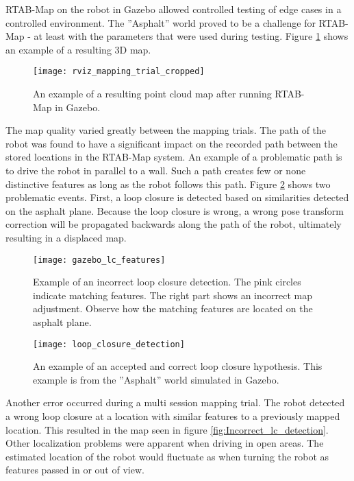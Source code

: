 \ac{RTAB-Map} on the robot in Gazebo allowed controlled testing of edge cases in a controlled environment. The ''Asphalt'' world proved to be a challenge for \ac{RTAB-Map} - at least with the parameters that were used during testing. Figure \ref{fig:rviz_mapping_trial} shows an example of a resulting 3D map. 

\begin{figure}[h]
	\centering
	\texttt{[image: rviz\_mapping\_trial\_cropped]}
	\caption{An example of a resulting point cloud map after running \ac{RTAB-Map} in Gazebo. }
	\label{fig:rviz_mapping_trial}
\end{figure}

The map quality varied greatly between the mapping trials. The path of the robot was found to have a significant impact on the recorded path between the stored locations in the \ac{RTAB-Map} system. An example of a problematic path is to drive the robot in parallel to a wall. Such a path creates few or none distinctive features as long as the robot follows this path. Figure \ref{fig:gazebo_lc_features} shows two problematic events. First, a loop closure is detected based on similarities detected on the asphalt plane. Because the loop closure is wrong, a wrong pose transform correction will be propagated backwards along the path of the robot, ultimately resulting in a displaced map.

\begin{figure}[h]
	\centering
	\texttt{[image: gazebo\_lc\_features]}
	\caption{Example of an incorrect loop closure detection. The pink circles indicate matching features. The right part shows an incorrect map adjustment. Observe how the matching features are located on the asphalt plane.}
	\label{fig:gazebo_lc_features}
\end{figure}

\begin{figure}[h]
	\centering
	\texttt{[image: loop\_closure\_detection]}
	\caption{An example of an accepted and correct loop closure hypothesis. This example is from the ''Asphalt'' world simulated in Gazebo.}
	\label{fig:loop_closure_detection}
\end{figure}

Another error occurred during a multi session mapping trial. The robot detected a wrong loop closure at a location with similar features to a previously mapped location. This resulted in the map seen in figure \ref{fig:Incorrect_lc_detection}. Other localization problems were apparent when driving in open areas. The estimated location of the robot would fluctuate as when turning the robot as features passed in or out of view.

